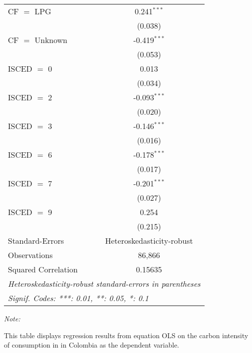\begin{table}[htbp!]
\begin{adjustbox}{width = 1\textwidth, max height = 0.95\textheight, center}
\begin{threeparttable}[b]
\begin{tabular}{lc}
            CF $=$ LPG          & 0.241$^{***}$\\   
                                & (0.038)\\   
            CF $=$ Unknown      & -0.419$^{***}$\\   
                                & (0.053)\\   
            ISCED $=$ 0         & 0.013\\   
                                & (0.034)\\   
            ISCED $=$ 2         & -0.093$^{***}$\\   
                                & (0.020)\\   
            ISCED $=$ 3         & -0.146$^{***}$\\   
                                & (0.016)\\   
            ISCED $=$ 6         & -0.178$^{***}$\\   
                                & (0.017)\\   
            ISCED $=$ 7         & -0.201$^{***}$\\   
                                & (0.027)\\   
            ISCED $=$ 9         & 0.254\\   
                                & (0.215)\\   
            \midrule 
            Standard-Errors     & Heteroskedasticity-robust \\   
            Observations        & 86,866\\  
            Squared Correlation & 0.15635\\  
            \midrule \midrule
            \multicolumn{2}{l}{\emph{Heteroskedasticity-robust standard-errors in parentheses}}\\
            \multicolumn{2}{l}{\emph{Signif. Codes: ***: 0.01, **: 0.05, *: 0.1}}\\
         \end{tabular}
         
         \begin{tablenotes}\item \medskip \textit{Note:}
            \item This table displays regression results from equation OLS on the carbon intensity of consumption in  in Colombia as the dependent variable. 
         \end{tablenotes}
      \end{threeparttable}
   \end{adjustbox}
\end{table}



